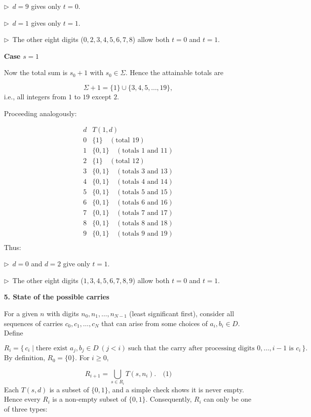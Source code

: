 \documentclass{llmxive}
\providecommand{\solutionheading}[1]{\par\smallskip\noindent\textbf{#1}\par}
\providecommand{\compactbullet}[1]{\par\noindent$\triangleright$~#1\par}
\begin{document}
\compactbullet{\(d = 9\) gives only \(t = 0\).}
\compactbullet{\(d = 1\) gives only \(t = 1\).}
\compactbullet{The other eight digits (\(0,2,3,4,5,6,7,8\)) allow both \(t = 0\) and \(t = 1\).}
\solutionheading{Case \(s = 1\)}
Now the total sum is \(s_0 + 1\) with \(s_0 \in \Sigma\). Hence the attainable totals are\par
\[
\Sigma + 1 = \{1\} \cup \{3,4,5,\dots,19\},
\]
i.e., all integers from \(1\) to \(19\) except \(2\).\par
Proceeding analogously:\par
\[
\begin{array}{c|l}
d & T(1,d) \\ \hline
0 & \{1\} \quad (\text{total }19) \\
1 & \{0,1\} \quad (\text{totals }1\text{ and }11) \\
2 & \{1\} \quad (\text{total }12) \\
3 & \{0,1\} \quad (\text{totals }3\text{ and }13) \\
4 & \{0,1\} \quad (\text{totals }4\text{ and }14) \\
5 & \{0,1\} \quad (\text{totals }5\text{ and }15) \\
6 & \{0,1\} \quad (\text{totals }6\text{ and }16) \\
7 & \{0,1\} \quad (\text{totals }7\text{ and }17) \\
8 & \{0,1\} \quad (\text{totals }8\text{ and }18) \\
9 & \{0,1\} \quad (\text{totals }9\text{ and }19) \\
\end{array}
\]
Thus:\par
\compactbullet{\(d = 0\) and \(d = 2\) give only \(t = 1\).}
\compactbullet{The other eight digits (\(1,3,4,5,6,7,8,9\)) allow both \(t = 0\) and \(t = 1\).}
\solutionheading{5. State of the possible carries}
For a given \(n\) with digits \(n_0,n_1,\dots,n_{N-1}\) (least significant first), consider all sequences of carries \(c_0,c_1,\dots,c_N\) that can arise from some choices of \(a_i,b_i\in D\). Define\par
\[
R_i = \{\, c_i \mid \text{there exist } a_j,b_j\in D\ (j<i)\ \text{such that the carry after processing digits }0,\dots,i-1\text{ is }c_i\,\}.
\]
By definition, \(R_0 = \{0\}\). For \(i \ge 0\),\par
\[
R_{i+1} = \bigcup_{s \in R_i} T(s, n_i). \quad\text{(1)}
\]
Each \(T(s,d)\) is a subset of \(\{0,1\}\), and a simple check shows it is never empty. Hence every \(R_i\) is a non-empty subset of \(\{0,1\}\). Consequently, \(R_i\) can only be one of three types:\par
\end{document}
